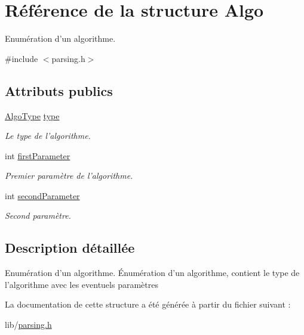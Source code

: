 \hypertarget{structAlgo}{
\section{Référence de la structure Algo}
\label{structAlgo}
}


Enumération d'un algorithme.  




{\ttfamily \#include $<$parsing.h$>$}

\subsection*{Attributs publics}
\begin{DoxyCompactItemize}
\item 
\hypertarget{structAlgo_ac238c59b48a6658c527f7ee987e0daac}{
\hyperlink{parsing_8h_aebdeb51354d2ee712846a9e02786cd74}{AlgoType} \hyperlink{structAlgo_ac238c59b48a6658c527f7ee987e0daac}{type}}
\label{structAlgo_ac238c59b48a6658c527f7ee987e0daac}

\begin{DoxyCompactList}\small\item\em Le type de l'algorithme. \item\end{DoxyCompactList}\item 
\hypertarget{structAlgo_a715ddb57a67fbadc6771d167f20d1d2e}{
int \hyperlink{structAlgo_a715ddb57a67fbadc6771d167f20d1d2e}{firstParameter}}
\label{structAlgo_a715ddb57a67fbadc6771d167f20d1d2e}

\begin{DoxyCompactList}\small\item\em Premier paramètre de l'algorithme. \item\end{DoxyCompactList}\item 
\hypertarget{structAlgo_a73bb72b60e1d63c33843ace474b7d957}{
int \hyperlink{structAlgo_a73bb72b60e1d63c33843ace474b7d957}{secondParameter}}
\label{structAlgo_a73bb72b60e1d63c33843ace474b7d957}

\begin{DoxyCompactList}\small\item\em Second paramètre. \item\end{DoxyCompactList}\end{DoxyCompactItemize}


\subsection{Description détaillée}
Enumération d'un algorithme. Énumération d'un algorithme, contient le type de l'algorithme avec les eventuels paramètres 

La documentation de cette structure a été générée à partir du fichier suivant :\begin{DoxyCompactItemize}
\item 
lib/\hyperlink{parsing_8h}{parsing.h}\end{DoxyCompactItemize}
